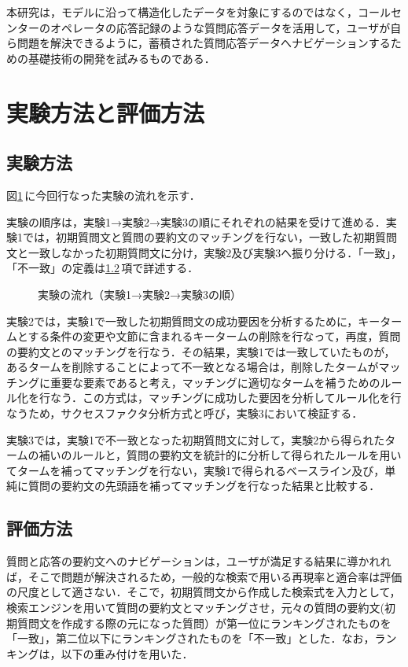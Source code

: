 本研究は，モデルに沿って構造化したデータを対象にするのではなく，コールセンターのオペレータの応答記録のような質問応答データを活用して，ユーザが自ら問題を解決できるように，蓄積された質問応答データへナビゲーションするための基礎技術の開発を試みるものである．


\section{実験方法と評価方法}\label{sec:4}
\subsection{実験方法}
図\ref{fig:exp}\,に今回行なった実験の流れを示す．

実験の順序は，実験1→実験2→実験3の順にそれぞれの結果を受けて進める．実験1では，初期質問文と質問の要約文のマッチングを行ない，一致した初期質問文と一致しなかった初期質問文に分け，実験2及び実験3へ振り分ける．「一致」，「不一致」の定義は\ref{sec:4.2}\,項で詳述する．

\begin{figure}[ht]
 \begin{center}
 \end{center}
 \caption{実験の流れ（実験1→実験2→実験3の順）}
 \label{fig:exp}
\end{figure}

実験2では，実験1で一致した初期質問文の成功要因を分析するために，キータームとする条件の変更や文節に含まれるキータームの削除を行なって，再度，質問の要約文とのマッチングを行なう．その結果，実験1では一致していたものが，あるタームを削除することによって不一致となる場合は，削除したタームがマッチングに重要な要素であると考え，マッチングに適切なタームを補うためのルール化を行なう．この方式は，マッチングに成功した要因を分析してルール化を行なうため，サクセスファクタ分析方式と呼び，実験3において検証する． 

実験3では，実験1で不一致となった初期質問文に対して，実験2から得られたタームの補いのルールと，質問の要約文を統計的に分析して得られたルールを用いてタームを補ってマッチングを行ない，実験1で得られるベースライン及び，単純に質問の要約文の先頭語を補ってマッチングを行なった結果と比較する．


\subsection{評価方法} \label{sec:4.2}
質問と応答の要約文へのナビゲーションは，ユーザが満足する結果に導かれれば，そこで問題が解決されるため，一般的な検索で用いる再現率と適合率は評価の尺度として適さない．そこで，初期質問文から作成した検索式を入力として，検索エンジンを用いて質問の要約文とマッチングさせ，元々の質問の要約文(初期質問文を作成する際の元になった質問）が第一位にランキングされたものを「一致」，第二位以下にランキングされたものを「不一致」とした．なお，ランキングは，以下の重み付けを用いた．

